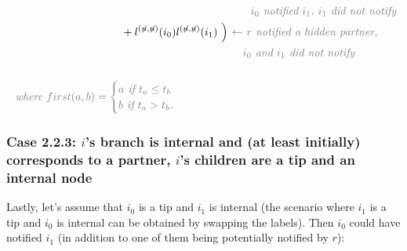 \documentclass[10pt,letterpaper]{article}
\begin{document}
\begin{equation}
\begin{split}
&\textit{\color{gray}~~~~~~~~~~~~~~~~~~~~~~~~~~~~~~~~~~~~~~~~~~~~~~~~~~~~~~~~~~~~~$i_0$ notified $i_1$, $i_1$ did not notify} \\
&~~~~~~~~~~~~~~~~~~~~~~~~~~~~~~+l^{(\not{n},\not{n})}(i_0)l^{(\not{n},\not{n})}(i_1)~\Big) \textit{\color{gray}~$\leftarrow$ $r$ notified a hidden partner,} \\
&\textit{\color{gray}~~~~~~~~~~~~~~~~~~~~~~~~~~~~~~~~~~~~~~~~~~~~~~~~~~~~~~~~~~~$i_0$ and $i_1$ did not notify} \\
\\
&\textit{\color{gray}~where } \color{gray}first(a,b) = 
\begin{cases}
a \textit{~if $t_a \leq t_b$}\\
b \textit{~if $t_a > t_b$.}
\end{cases} 
 \end{split}
\label{eq:lu-tip-tip}
\end{equation}


\subsubsection*{Case 2.2.3: $i$'s branch is internal and (at least initially) corresponds to a partner, $i$'s children are a tip and an internal node}
Lastly, let's assume that $i_0$ is a tip and $i_1$ is internal (the scenario where $i_1$ is a tip and $i_0$ is internal can be obtained by swapping the labels). Then $i_0$ could have notified $i_1$ (in addition to one of them being potentially notified by $r$):
\end{document}
